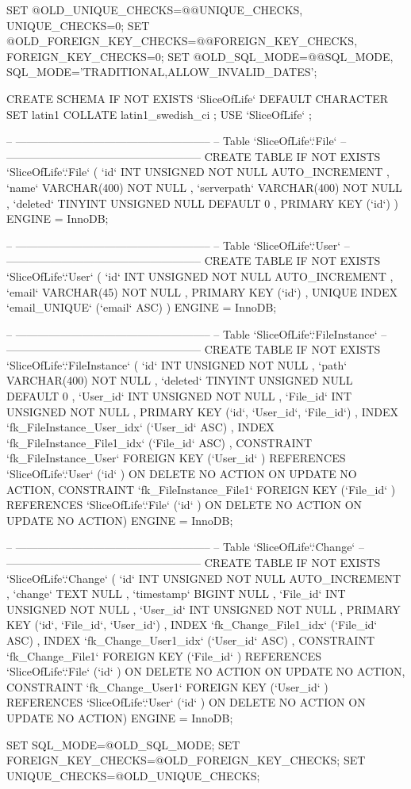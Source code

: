 \begin{spverbatim}
SET @OLD_UNIQUE_CHECKS=@@UNIQUE_CHECKS, UNIQUE_CHECKS=0;
SET @OLD_FOREIGN_KEY_CHECKS=@@FOREIGN_KEY_CHECKS, FOREIGN_KEY_CHECKS=0;
SET @OLD_SQL_MODE=@@SQL_MODE, SQL_MODE='TRADITIONAL,ALLOW_INVALID_DATES';

CREATE SCHEMA IF NOT EXISTS `SliceOfLife` DEFAULT CHARACTER SET latin1 COLLATE latin1_swedish_ci ;
USE `SliceOfLife` ;

-- -----------------------------------------------------
-- Table `SliceOfLife`.`File`
-- -----------------------------------------------------
CREATE  TABLE IF NOT EXISTS `SliceOfLife`.`File` (
  `id` INT UNSIGNED NOT NULL AUTO_INCREMENT ,
  `name` VARCHAR(400) NOT NULL ,
  `serverpath` VARCHAR(400) NOT NULL ,
  `deleted` TINYINT UNSIGNED NULL DEFAULT 0 ,
  PRIMARY KEY (`id`) )
ENGINE = InnoDB;


-- -----------------------------------------------------
-- Table `SliceOfLife`.`User`
-- -----------------------------------------------------
CREATE  TABLE IF NOT EXISTS `SliceOfLife`.`User` (
  `id` INT UNSIGNED NOT NULL AUTO_INCREMENT ,
  `email` VARCHAR(45) NOT NULL ,
  PRIMARY KEY (`id`) ,
  UNIQUE INDEX `email_UNIQUE` (`email` ASC) )
ENGINE = InnoDB;


-- -----------------------------------------------------
-- Table `SliceOfLife`.`FileInstance`
-- -----------------------------------------------------
CREATE  TABLE IF NOT EXISTS `SliceOfLife`.`FileInstance` (
  `id` INT UNSIGNED NOT NULL ,
  `path` VARCHAR(400) NOT NULL ,
  `deleted` TINYINT UNSIGNED NULL DEFAULT 0 ,
  `User_id` INT UNSIGNED NOT NULL ,
  `File_id` INT UNSIGNED NOT NULL ,
  PRIMARY KEY (`id`, `User_id`, `File_id`) ,
  INDEX `fk_FileInstance_User_idx` (`User_id` ASC) ,
  INDEX `fk_FileInstance_File1_idx` (`File_id` ASC) ,
  CONSTRAINT `fk_FileInstance_User`
    FOREIGN KEY (`User_id` )
    REFERENCES `SliceOfLife`.`User` (`id` )
    ON DELETE NO ACTION
    ON UPDATE NO ACTION,
  CONSTRAINT `fk_FileInstance_File1`
    FOREIGN KEY (`File_id` )
    REFERENCES `SliceOfLife`.`File` (`id` )
    ON DELETE NO ACTION
    ON UPDATE NO ACTION)
ENGINE = InnoDB;


-- -----------------------------------------------------
-- Table `SliceOfLife`.`Change`
-- -----------------------------------------------------
CREATE  TABLE IF NOT EXISTS `SliceOfLife`.`Change` (
  `id` INT UNSIGNED NOT NULL AUTO_INCREMENT ,
  `change` TEXT NULL ,
  `timestamp` BIGINT NULL ,
  `File_id` INT UNSIGNED NOT NULL ,
  `User_id` INT UNSIGNED NOT NULL ,
  PRIMARY KEY (`id`, `File_id`, `User_id`) ,
  INDEX `fk_Change_File1_idx` (`File_id` ASC) ,
  INDEX `fk_Change_User1_idx` (`User_id` ASC) ,
  CONSTRAINT `fk_Change_File1`
    FOREIGN KEY (`File_id` )
    REFERENCES `SliceOfLife`.`File` (`id` )
    ON DELETE NO ACTION
    ON UPDATE NO ACTION,
  CONSTRAINT `fk_Change_User1`
    FOREIGN KEY (`User_id` )
    REFERENCES `SliceOfLife`.`User` (`id` )
    ON DELETE NO ACTION
    ON UPDATE NO ACTION)
ENGINE = InnoDB;



SET SQL_MODE=@OLD_SQL_MODE;
SET FOREIGN_KEY_CHECKS=@OLD_FOREIGN_KEY_CHECKS;
SET UNIQUE_CHECKS=@OLD_UNIQUE_CHECKS;
\end{spverbatim}
\newpage
